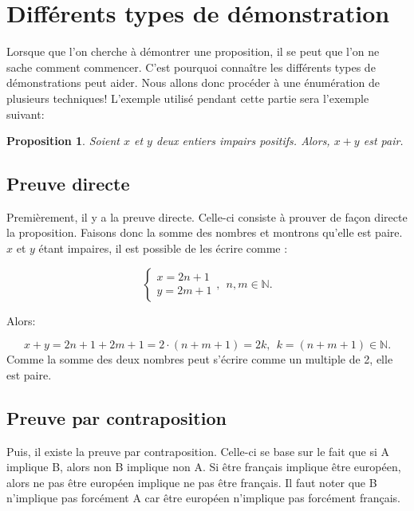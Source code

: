 \documentclass[oneside,12pt,french,table]{book}
\theoremstyle{definition}
\theoremstyle{plain}
\newtheorem{proposition}[definition]{Proposition}
\theoremstyle{remark}
\begin{document}
\section{Différents types de démonstration}

Lorsque que l'on cherche à démontrer une proposition, il se peut que l'on ne sache comment commencer. C'est pourquoi connaître les différents types de démonstrations peut aider. Nous allons donc procéder à une énumération de plusieurs techniques!
L'exemple utilisé pendant cette partie sera l'exemple suivant:
\begin{proposition}
Soient $x$ et $y$ deux entiers impairs positifs. Alors, $x+y$ est pair.
\end{proposition}

\subsection{Preuve directe}
Premièrement, il y a la preuve directe. Celle-ci consiste à prouver de façon directe la proposition. Faisons donc la somme des nombres et montrons qu'elle est paire. \\

$x$ et $y$ étant impaires, il est possible de les écrire comme :

\begin{equation}
    \begin{cases}
        x=2n+1\\
        y=2m+1
    \end{cases},~~ n,m\in \mathbb{N}.
\end{equation}

Alors:

\begin{equation}
    x+y=2n+1+2m+1=2\cdot(n+m+1)=2k, ~~ k=(n+m+1)\in \mathbb{N}.
\end{equation}
Comme la somme des deux nombres peut s'écrire comme un multiple de 2, elle est paire.\\

\subsection{Preuve par contraposition}
Puis, il existe la preuve par contraposition. Celle-ci se base sur le fait que si A implique B, alors non B implique non A. Si être français implique être européen, alors ne pas être européen implique ne pas être français. Il faut noter que B n'implique pas forcément A car être européen n'implique pas forcément français.
\end{document}
